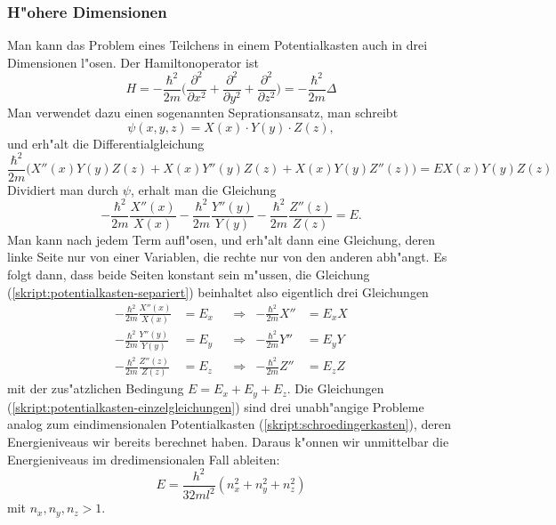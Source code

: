 \subsubsection{H"ohere Dimensionen}
Man kann das Problem eines Teilchens in einem Potentialkasten auch
in drei Dimensionen l"osen.
Der Hamiltonoperator ist 
\[
H=-\frac{\hbar^2}{2m}\biggl(
\frac{\partial^2}{\partial x^2}
+
\frac{\partial^2}{\partial y^2}
+
\frac{\partial^2}{\partial z^2}
\biggr)
=-\frac{\hbar^2}{2m}\Delta
\]
Man verwendet dazu einen sogenannten Seprationsansatz, man schreibt
\[
\psi(x,y,z)=X(x)\cdot Y(y)\cdot Z(z),
\]
und erh"alt die Differentialgleichung
\[
\frac{\hbar^2}{2m}\biggl(
X''(x)Y(y)Z(z)
+
X(x)Y''(y)Z(z)
+
X(x)Y(y)Z''(z)
\biggr)
=
EX(x)Y(y)Z(z)
\]
Dividiert man durch $\psi$, erhalt man die Gleichung
\begin{equation}
-\frac{\hbar^2}{2m}\frac{X''(x)}{X(x)}
-
\frac{\hbar^2}{2m}\frac{Y''(y)}{Y(y)}
-
\frac{\hbar^2}{2m}\frac{Z''(z)}{Z(z)}
=
E.
\label{skript:potentialkasten-separiert}
\end{equation}
Man kann nach jedem Term aufl"osen, und erh"alt dann eine Gleichung,
deren linke Seite nur von einer Variablen, die rechte nur von den anderen
abh"angt.
Es folgt dann, dass beide Seiten konstant sein m"ussen, 
die Gleichung (\ref{skript:potentialkasten-separiert}) beinhaltet also eigentlich
drei Gleichungen
\begin{equation}
\begin{aligned}
-\frac{\hbar^2}{2m}\frac{X''(x)}{X(x)}&=E_x&&\Rightarrow&-\frac{\hbar^2}{2m}X''&=E_xX\\
-\frac{\hbar^2}{2m}\frac{Y''(y)}{Y(y)}&=E_y&&\Rightarrow&-\frac{\hbar^2}{2m}Y''&=E_yY\\
-\frac{\hbar^2}{2m}\frac{Z''(z)}{Z(z)}&=E_z&&\Rightarrow&-\frac{\hbar^2}{2m}Z''&=E_zZ
\end{aligned}
\label{skript:potentialkasten-einzelgleichungen}
\end{equation}
mit der zus"atzlichen Bedingung $E=E_x+E_y+E_z$.
Die Gleichungen (\ref{skript:potentialkasten-einzelgleichungen}) sind drei
unabh"angige Probleme analog zum eindimensionalen Potentialkasten
(\ref{skript:schroedingerkasten}), deren Energieniveaus wir bereits berechnet
haben.
Daraus k"onnen wir unmittelbar die Energieniveaus im dredimensionalen
Fall ableiten:
\begin{equation}
E=\frac{h^2}{32ml^2}(n_x^2+n_y^2+n_z^2)
\label{skript:3dzustaende}
\end{equation}
mit $n_x,n_y,n_z>1$.

